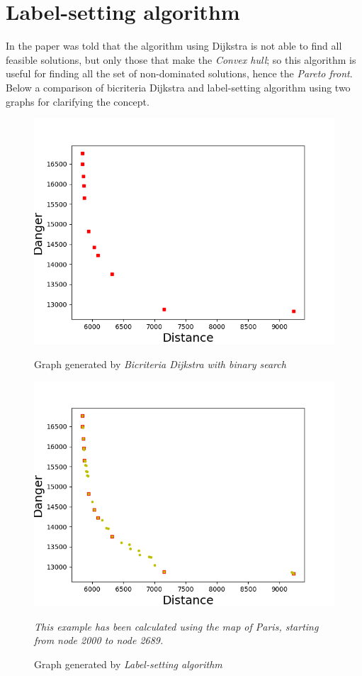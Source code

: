 \documentclass[a4paper,11pt]{report}
\begin{document}
\section{Label-setting algorithm}
In the paper was told that the algorithm using Dijkstra is not able to find all feasible solutions, but only those that make the \textit{Convex hull}; so this algorithm is useful for finding all the set of non-dominated solutions, hence the \textit{Pareto front}. Below a comparison of bicriteria Dijkstra and label-setting algorithm using two graphs for clarifying the concept.
\begin{figure}[H]
	\centering
	\begin{minipage}[b]{0.49\textwidth}
		\includegraphics[width=\textwidth, trim= 0 0 15mm 14mm, clip]{img/graphDijkstraBicrit.png}
		\caption{Graph generated by \textit{Bicriteria Dijkstra with binary search}}
		\label{fig:graphBiDi}
	\end{minipage}
	\hfill
	\begin{minipage}[b]{0.49\textwidth}
		\includegraphics[width=\textwidth, trim= 0 0 15mm 14mm, clip]{img/graphLabelsetting.png}
		\caption{Graph generated by \textit{Label-setting algorithm}}
		\label{fig:graphLabSet}
	\end{minipage}
\textit{{\tiny This example has been calculated using the map of Paris, starting from node 2000 to node 2689.}}
\end{figure}
\end{document}
